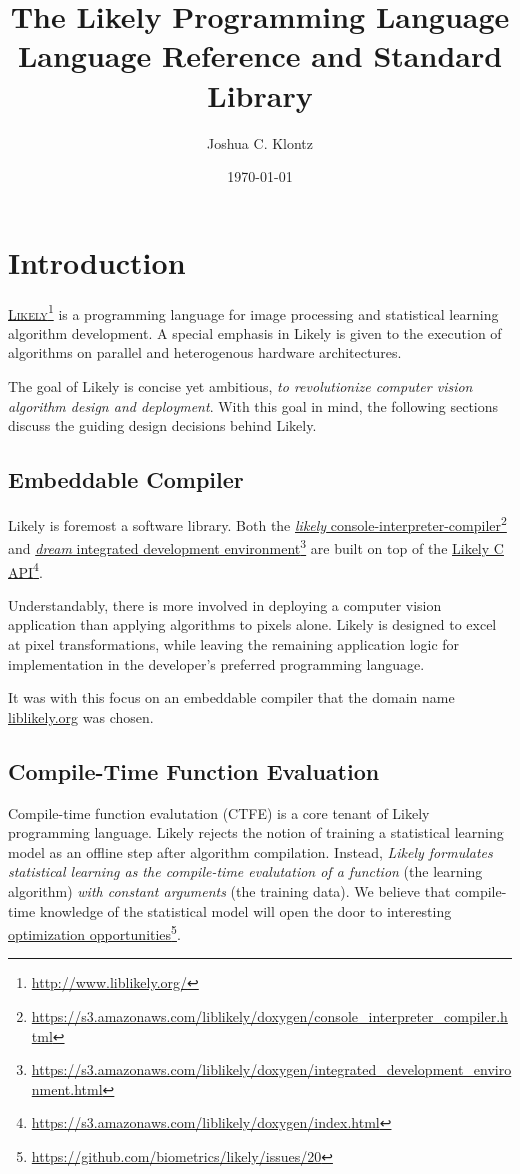 \documentclass[numbers=noenddot]{scrbook}
\title{The Likely Programming Language \\
       {\large Language Reference and Standard Library}}
\author{Joshua C. Klontz}
\date{\today}
\newcommand{\noun}[1]{\textsc{#1}}
\newcommand{\fref}[2]{\href{#1}{#2}\footnote{\href{#1}{#1}}}
\begin{document}
\maketitle
\tableofcontents

\chapter{Introduction}
\fref{http://www.liblikely.org/}{\noun{Likely}} is a programming language for image processing and statistical learning algorithm development.
A special emphasis in Likely is given to the execution of algorithms on parallel and heterogenous hardware architectures.

The goal of Likely is concise yet ambitious, \emph{to revolutionize computer vision algorithm design and deployment}.
With this goal in mind, the following sections discuss the guiding design decisions behind Likely.

\section{Embeddable Compiler}
Likely is foremost a software library.
Both the \fref{https://s3.amazonaws.com/liblikely/doxygen/console\_interpreter\_compiler.html}{\emph{likely} console-interpreter-compiler} and \fref{https://s3.amazonaws.com/liblikely/doxygen/integrated\_development\_environment.html}{\emph{dream} integrated development environment} are built on top of the \fref{https://s3.amazonaws.com/liblikely/doxygen/index.html}{Likely C API}.

Understandably, there is more involved in deploying a computer vision application than applying algorithms to pixels alone.
Likely is designed to excel at pixel transformations, while leaving the remaining application logic for implementation in the developer's preferred programming language.

It was with this focus on an embeddable compiler that the domain name \url{liblikely.org} was chosen.

\section{Compile-Time Function Evaluation}
Compile-time function evalutation (CTFE) is a core tenant of Likely programming language.
Likely rejects the notion of training a statistical learning model as an offline step after algorithm compilation.
Instead, \emph{Likely formulates statistical learning as the compile-time evalutation of a function} (the learning algorithm) \emph{with constant arguments} (the training data).
We believe that compile-time knowledge of the statistical model will open the door to interesting \fref{https://github.com/biometrics/likely/issues/20}{optimization opportunities}.
\end{document}
